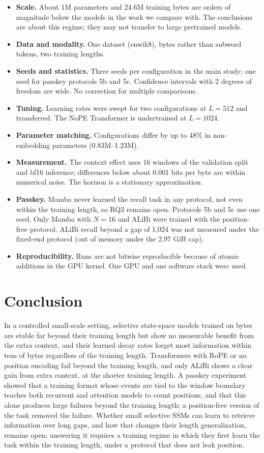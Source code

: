 \documentclass[11pt]{article}
\begin{document}
\begin{itemize}
  \item \textbf{Scale.} About 1M parameters and 24.6M training bytes are orders of magnitude below the models in the work we compare with. The conclusions are about this regime; they may not transfer to large pretrained models.
  \item \textbf{Data and modality.} One dataset (enwik8), bytes rather than subword tokens, two training lengths.
  \item \textbf{Seeds and statistics.} Three seeds per configuration in the main study; one seed for passkey protocols 5b and 5c. Confidence intervals with 2 degrees of freedom are wide. No correction for multiple comparisons.
  \item \textbf{Tuning.} Learning rates were swept for two configurations at $L = 512$ and transferred. The NoPE Transformer is undertrained at $L = 1024$.
  \item \textbf{Parameter matching.} Configurations differ by up to 48\% in non-embedding parameters (0.83M--1.23M).
  \item \textbf{Measurement.} The context effect uses 16 windows of the validation split and bf16 inference; differences below about 0.001 bits per byte are within numerical noise. The horizon is a stationary approximation.
  \item \textbf{Passkey.} Mamba never learned the recall task in any protocol, not even within the training length, so RQ3 remains open. Protocols 5b and 5c use one seed. Only Mamba with $N = 16$ and ALiBi were trained with the position-free protocol. ALiBi recall beyond a gap of 1,024 was not measured under the fixed-end protocol (out of memory under the 2.97 GiB cap).
  \item \textbf{Reproducibility.} Runs are not bitwise reproducible because of atomic additions in the GPU kernel. One GPU and one software stack were used.
\end{itemize}

\section{Conclusion}\label{sec:conclusion}

In a controlled small-scale setting, selective state-space models trained on bytes are stable far beyond their training length but show no measurable benefit from the extra context, and their learned decay rates forget most information within tens of bytes regardless of the training length. Transformers with RoPE or no position encoding fail beyond the training length, and only ALiBi shows a clear gain from extra context, at the shorter training length. A passkey experiment showed that a training format whose events are tied to the window boundary teaches both recurrent and attention models to count positions, and that this alone produces large failures beyond the training length; a position-free version of the task removed the failure. Whether small selective SSMs can learn to retrieve information over long gaps, and how that changes their length generalization, remains open; answering it requires a training regime in which they first learn the task within the training length, under a protocol that does not leak position.
\end{document}
